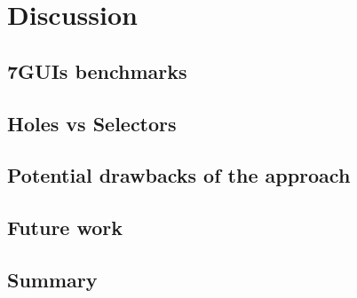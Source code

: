 \chapter{Discussion}
\label{chap:discussion}


\section{7GUIs benchmarks}
\section{Holes vs Selectors}
\section{Potential drawbacks of the approach}
\section{Future work}
\section{Summary}
